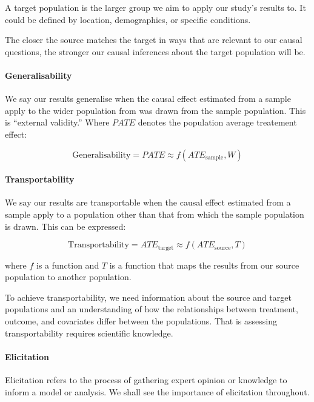 \documentclass[
  singlecolumn]{article}
\let\oldparagraph\paragraph
\renewcommand{\paragraph}[1]{\oldparagraph{#1}\mbox{}}
\begin{document}
A target population is the larger group we aim to apply our study's
results to. It could be defined by location, demographics, or specific
conditions.

The closer the source matches the target in ways that are relevant to
our causal questions, the stronger our causal inferences about the
target population will be.

\paragraph{\texorpdfstring{\textbf{Generalisability}}{Generalisability}}\label{generalisability}

We say our results generalise when the causal effect estimated from a
sample apply to the wider population from was drawn from the sample
population. This is ``external validity.'' Where \(PATE\) denotes the
population average treatement effect:

\[\text{Generalisability} = PATE \approx f(ATE_{\text{sample}}, W)\]

\paragraph{\texorpdfstring{\textbf{Transportability}}{Transportability}}\label{transportability}

We say our results are transportable when the causal effect estimated
from a sample apply to a population other than that from which the
sample population is drawn. This can be expressed:

\[\text{Transportability} = ATE_{\text{target}} \approx f(ATE_{\text{source}}, T)\]

where \(f\) is a function and \(T\) is a function that maps the results
from our source population to another population.

To achieve transportability, we need information about the source and
target populations and an understanding of how the relationships between
treatment, outcome, and covariates differ between the populations. That
is assessing transportability requires scientific knowledge.

\paragraph{\texorpdfstring{\textbf{Elicitation}}{Elicitation}}\label{elicitation}

Elicitation refers to the process of gathering expert opinion or
knowledge to inform a model or analysis. We shall see the importance of
elicitation throughout.
\end{document}
